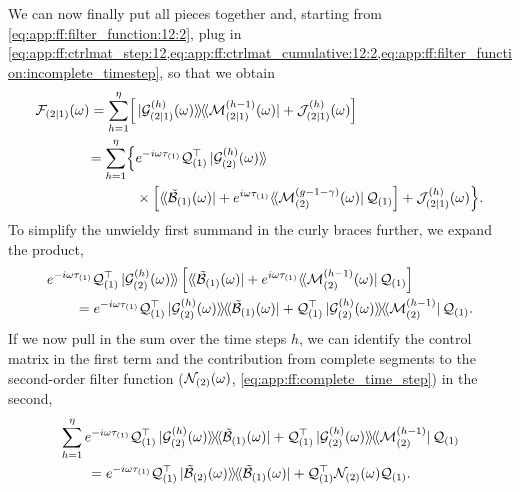 We can now finally put all pieces together and, starting from \cref{eq:app:ff:filter_function:12:2}, plug in \cref{eq:app:ff:ctrlmat_step:12,eq:app:ff:ctrlmat_cumulative:12:2,eq:app:ff:filter_function:incomplete_timestep}, so that we obtain
\begin{align}
    \FF_{(2|1)}(\omega) = \sum_{h=1}^{\eta}\Bigl[ & \dop*{\mc{G}_{(2|1)}\gth{h}(\omega)}{\mc{M}_{(2|1)}\gth{h-1}(\omega)}
                                                    + \mc{J}_{(2|1)}\gth{h}(\omega)\Bigr] \notag \\
                        = \sum_{h=1}^{\eta}\Bigl\lbrace
                               & \e^{-\i\omega\tau_{(1)}}\liouvQ_{(1)}\transpose\dket*{\mc{G}_{(2)}\gth{h}(\omega)} \\
                               & \times\Bigl[
                                     \dbra*{\ctrlmat_{(1)}(\omega)} + \e^{\i\omega\tau_{(1)}}\dbra*{\mc{M}_{(2)}\gth{g-1-\gamma}(\omega)}\liouvQ_{(1)}
                                 \Bigr] +\mc{J}_{(2|1)}\gth{h}(\omega)
                        \Bigr\rbrace. \notag
\end{align}
To simplify the unwieldy first summand in the curly braces further, we expand the product,
\begin{align}
    \MoveEqLeft \e^{-\i\omega\tau_{(1)}}\liouvQ_{(1)}\transpose\dket*{\mc{G}_{(2)}\gth{h}(\omega)}\left[\dbra*{\ctrlmat_{(1)}(\omega)}
            + \e^{\i\omega\tau_{(1)}}\dbra*{\mc{M}_{(2)}\gth{h-1}(\omega)}\liouvQ_{(1)}\right] \\
        &= \e^{-\i\omega\tau_{(1)}}\liouvQ_{(1)}\transpose\dop*{\mc{G}_{(2)}\gth{h}(\omega)}{\ctrlmat_{(1)}(\omega)}
            + \liouvQ_{(1)}\transpose\dop*{\mc{G}_{(2)}\gth{h}(\omega)}{\mc{M}_{(2)}\gth{h-1}}\liouvQ_{(1)}. \notag
\end{align}
If we now pull in the sum over the time steps $h$, we can identify the control matrix in the first term and the contribution from complete segments to the second-order filter function ($\mathcal{N}_{(2)}(\omega)$, \cref{eq:app:ff:complete_time_step}) in the second,
\begin{align}
    \MoveEqLeft \sum_{h=1}^{\eta}\e^{-\i\omega\tau_{(1)}}\liouvQ_{(1)}\transpose\dop*{\mc{G}_{(2)}\gth{h}(\omega)}{\ctrlmat_{(1)}(\omega)}
            + \liouvQ_{(1)}\transpose\dop*{\mc{G}_{(2)}\gth{h}(\omega)}{\mc{M}_{(2)}\gth{h-1}}\liouvQ_{(1)} \notag \\
        &= \e^{-\i\omega\tau_{(1)}}\liouvQ_{(1)}\transpose\dop*{\ctrlmat_{(2)}(\omega)}{\ctrlmat_{(1)}(\omega)}
            + \liouvQ_{(1)}\transpose\mc{N}_{(2)}(\omega)\liouvQ_{(1)}.
\end{align}
